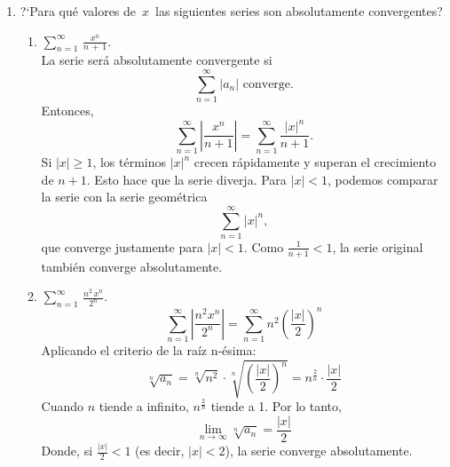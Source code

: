 \documentclass{article}
\begin{document}
\begin{enumerate}
\begin{enumerate}
- Si $L<1$ la serie converge

- Si $L>1$ la serie diverge

- Si $L=1$ el criterio es inconcluso

$$
\begin{gathered}
a_n=\frac{1}{n^1+\frac{1}{n}} \\
\sqrt[n]{a_n}=\frac{1}{\sqrt[n]{n^1+\frac{1}{n}}} \\
\sqrt[n]{a_n}=\frac{1}{\sqrt[n]{n^1+\frac{1}{n}}}=\frac{1}{n^{\frac{1}{n}}+\frac{1}{n^2}}
\end{gathered}
$$

- $n^{\frac{1}{n}} \rightarrow 1$

- $\frac{1}{n^2} \rightarrow 1$

- $\sqrt[n]{a_n} \rightarrow 1$

$$
\lim _{n \rightarrow \infty} \sqrt[n]{a_n}=1
$$

- Por lo que $L=1$ el criterio es inconcluso

\end{enumerate}

\item ?`Para qu\'e valores de \,$x$\, las siguientes series son absolutamente convergentes?

\begin{enumerate}

\item $\displaystyle\sum_{n=1}^{\infty}\,\frac{x^n}{n\,+\,1}$.
\[\]
La serie será absolutamente convergente si 
\[
\sum_{n=1}^{\infty} \left| a_n \right| \text{ converge.}
\]
Entonces,
\[
\sum_{n=1}^{\infty} \left| \frac{x^n}{n+1} \right| = \sum_{n=1}^{\infty} \frac{|x|^n}{n+1}.
\]
Si \( |x| \geq 1 \), los términos \( |x|^n \) crecen rápidamente y superan el crecimiento de \( n+1 \). Esto hace que la serie diverja. 
Para \( |x| < 1 \), podemos comparar la serie con la serie geométrica 
\[
\sum_{n=1}^{\infty} |x|^n,
\]
que converge justamente para \( |x| < 1 \). Como \( \frac{1}{n+1} < 1 \), la serie original también converge absolutamente.

\item $\displaystyle\sum_{n=1}^{\infty}\,\frac{n^2\,x^n}{2^n}$.
\[\]
\[
\sum_{n=1}^{\infty} \left| \frac{n^2 x^n}{2^n} \right| = \sum_{n=1}^{\infty} n^2 \left( \frac{|x|}{2} \right)^n
\]
Aplicando el criterio de la raíz n-ésima:
\[
\sqrt[n]{a_n} = \sqrt[n]{n^2} \cdot \sqrt[n]{\left( \frac{|x|}{2} \right)^n} = n^{\frac{2}{n}} \cdot \frac{|x|}{2}
\]
Cuando \( n \) tiende a infinito, \( n^{\frac{2}{n}} \) tiende a 1. Por lo tanto,
\[
\lim_{n \to \infty} \sqrt[n]{a_n} = \frac{|x|}{2}
\]
Donde, si \( \frac{|x|}{2} < 1 \) (es decir, \( |x| < 2 \)), la serie converge absolutamente.


\end{enumerate}
\end{enumerate}
\end{document}
